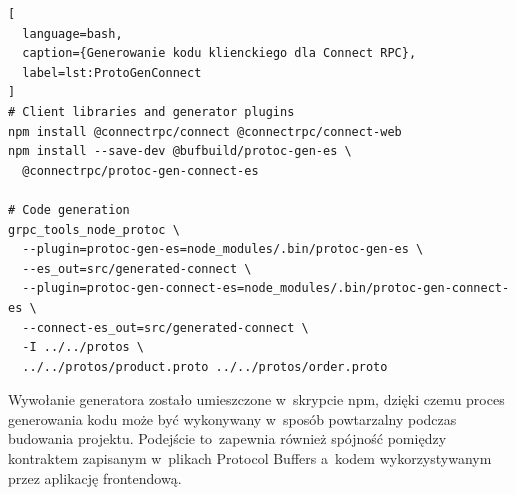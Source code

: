\begin{lstlisting}[
  language=bash,
  caption={Generowanie kodu klienckiego dla Connect RPC},
  label=lst:ProtoGenConnect
]
# Client libraries and generator plugins
npm install @connectrpc/connect @connectrpc/connect-web
npm install --save-dev @bufbuild/protoc-gen-es \
  @connectrpc/protoc-gen-connect-es

# Code generation
grpc_tools_node_protoc \
  --plugin=protoc-gen-es=node_modules/.bin/protoc-gen-es \
  --es_out=src/generated-connect \
  --plugin=protoc-gen-connect-es=node_modules/.bin/protoc-gen-connect-es \
  --connect-es_out=src/generated-connect \
  -I ../../protos \
  ../../protos/product.proto ../../protos/order.proto
\end{lstlisting}

Wywołanie generatora zostało umieszczone w~skrypcie npm, dzięki czemu proces generowania kodu może być wykonywany w~sposób powtarzalny podczas budowania projektu. Podejście to~zapewnia również spójność pomiędzy kontraktem zapisanym w~plikach Protocol Buffers a~kodem wykorzystywanym przez aplikację frontendową.

